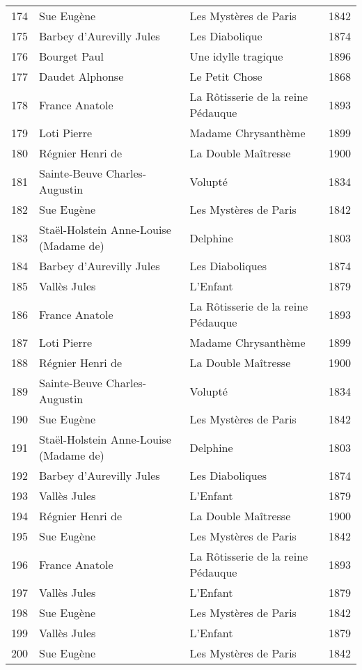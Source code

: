 \begin{table}[H]
\begin{tabular}{l l l l}
    174 & Sue Eugène & Les Mystères de Paris & 1842 \\
    175 & Barbey d'Aurevilly Jules & Les Diabolique & 1874 \\
    176 & Bourget Paul & Une idylle tragique & 1896 \\
    177 & Daudet Alphonse & Le Petit Chose & 1868 \\
    178 & France Anatole & La Rôtisserie de la reine Pédauque & 1893 \\
    179 & Loti Pierre & Madame Chrysanthème & 1899 \\
    180 & Régnier Henri de & La Double Maîtresse & 1900 \\
    181 & Sainte-Beuve Charles-Augustin & Volupté & 1834 \\
    182 & Sue Eugène & Les Mystères de Paris & 1842 \\
    183 & Staël-Holstein Anne-Louise (Madame de) & Delphine & 1803 \\
    184 & Barbey d'Aurevilly Jules & Les Diaboliques & 1874 \\
    185 & Vallès Jules & L'Enfant & 1879 \\
    186 & France Anatole & La Rôtisserie de la reine Pédauque & 1893 \\
    187 & Loti Pierre & Madame Chrysanthème & 1899 \\
    188 & Régnier Henri de & La Double Maîtresse & 1900 \\
    189 & Sainte-Beuve Charles-Augustin & Volupté & 1834 \\
    190 & Sue Eugène & Les Mystères de Paris & 1842 \\
    191 & Staël-Holstein Anne-Louise (Madame de) & Delphine & 1803 \\
    192 & Barbey d'Aurevilly Jules & Les Diaboliques & 1874 \\
    193 & Vallès Jules & L'Enfant & 1879 \\
    194 & Régnier Henri de & La Double Maîtresse & 1900 \\
    195 & Sue Eugène & Les Mystères de Paris & 1842 \\
    196 & France Anatole & La Rôtisserie de la reine Pédauque & 1893 \\
    197 & Vallès Jules & L'Enfant & 1879 \\
    198 & Sue Eugène & Les Mystères de Paris & 1842 \\
    199 & Vallès Jules & L'Enfant & 1879 \\
    200 & Sue Eugène & Les Mystères de Paris & 1842 \\
    \bottomrule
  \end{tabular}
\end{table}

